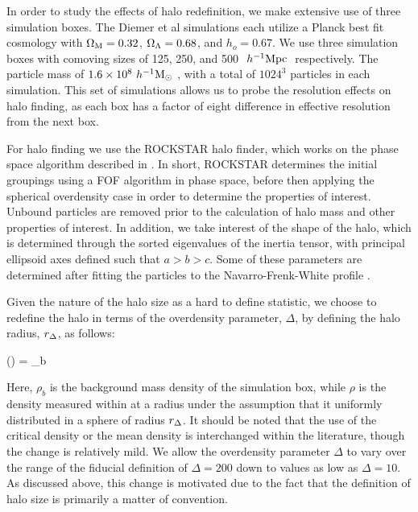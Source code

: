 \documentclass[usenatbib,usegraphicx,letterpaper]{mn2e}
\begin{document}
In order to study the effects of halo redefinition, we make extensive use of three simulation boxes. The Diemer et al simulations each utilize a Planck best fit cosmology with $\Omega_{\mathrm{M}} = 0.32$, $\Omega_{\Lambda} = 0.68$, and $h_o = 0.67$. We use three simulation boxes with comoving sizes of 125, 250, and 500 $\ h^{-1}\mathrm{Mpc}~$ respectively. The particle mass of $1.6 \times 10^8 \ h^{-1}\mathrm{M}_{\odot}~$, with a total of $1024^3$ particles in each simulation. This set of simulations allows us to probe the resolution effects on halo finding, as each box has a factor of eight difference in effective resolution from the next box. 

For halo finding we use the ROCKSTAR halo finder, which works on the phase space algorithm described in \citet*{behroozi13}. In short, ROCKSTAR determines the initial groupings using a FOF algorithm in phase space, before then applying the spherical overdensity case in order to determine the properties of interest. Unbound particles are removed prior to the calculation of halo mass and other properties of interest. In addition, we take interest of the shape of the halo, which is determined through the sorted eigenvalues of the inertia tensor, with principal ellipsoid axes defined such that $a >b > c$. Some of these parameters are determined after fitting the particles to the Navarro-Frenk-White profile \citep*{nfw97}.

Given the nature of the halo size as a hard to define statistic, we choose to redefine the halo in terms of the overdensity parameter, $\Delta$, by defining the halo radius, $r_{\Delta}$, as follows:

\beq
	\rho(\Rdel) = \Delta \rho_b
\eeq

Here, $\rho_b$ is the background mass density of the simulation box, while $\rho$ is the density measured within at a radius under the assumption that it uniformly distributed in a sphere of radius $r_{\Delta}$. It should be noted that the use of the critical density or the mean density is interchanged within the literature, though the change is relatively mild. We allow the overdensity parameter $\Delta$ to vary over the range of the fiducial definition of $\Delta = 200$ down to values as low as $\Delta = 10$. As discussed above, this change is motivated due to the fact that the definition of halo size is primarily a matter of convention.
\end{document}
